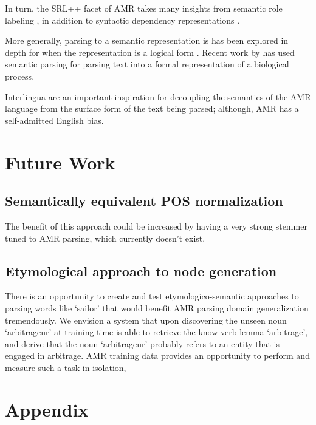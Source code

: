 \documentclass[11pt]{article}
\begin{document}
In turn, the SRL++ facet of AMR takes many insights from semantic role labeling
  \cite{2002gildea-srl,2004punyakanok-srl,srikumar2013-srl}, in addition to
  syntactic dependency representations 
  \cite{stanford-dependencies,2005mcdonald-dependency0,2006buchholz-conll}.

More generally, parsing to a semantic representation is has been explored in
  depth for when the representation is a logical form
  \cite{2005kate-semantics,2005zettlemoyer-semantics,2011liang-semantics}.
Recent work by  has used semantic parsing for parsing 
  text into a formal representation of a biological process.

Interlingua
  \cite{1991mitamura-interlingua,1999carbonell-interlingua,1998levin-interlingua}
  are an important inspiration for decoupling the semantics of the AMR language
  from the surface form of the text being parsed; although, AMR has a self-admitted
  English bias.

\section{Future Work}
\subsection{Semantically equivalent POS normalization}
The benefit of this approach could be increased by having a very strong stemmer tuned to AMR parsing, which currently doesn't exist.
\subsection{Etymological approach to node generation}
There is an opportunity to create and test etymologico-semantic approaches to parsing words like `sailor' that would benefit AMR parsing domain generalization tremendously. We envision a system that upon discovering the unseen noun `arbitrageur' at training time is able to retrieve the know verb lemma `arbitrage', and derive that the noun `arbitrageur' probably refers to an entity that is engaged in arbitrage. AMR training data provides an opportunity to perform and measure such a task in isolation, 

\section{Appendix}
\end{document}

